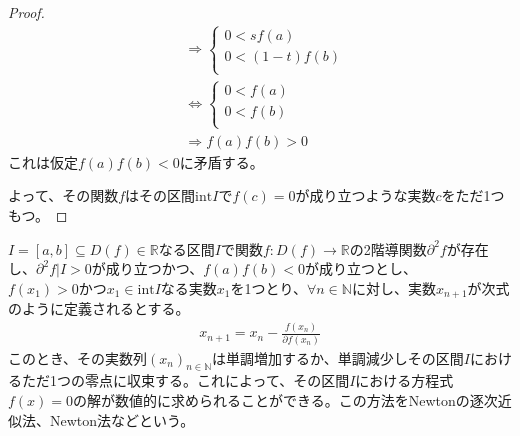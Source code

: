 \documentclass[dvipdfmx]{jsarticle}
\begin{document}
\begin{proof}
\begin{align*}
&\Rightarrow \left\{ \begin{matrix}
0 < sf(a) \\
0 < \left( 1 - t \right)f(b) \\
\end{matrix} \right.\\
&\Leftrightarrow \left\{ \begin{matrix}
0 < f(a) \\
0 < f(b) \\
\end{matrix} \right.\\
&\Rightarrow f(a)f(b) > 0
\end{align*}
これは仮定$f(a)f(b) < 0$に矛盾する。\par
よって、その関数$f$はその区間$\mathrm{int}I$で$f(c) = 0$が成り立つような実数$c$をただ1つもつ。
\end{proof}
\begin{thm}[Newtonの逐次近似法]\label{4.2.2.19}
$I = [ a,b] \subseteq D(f) \in \mathbb{R}$なる区間$I$で関数$f:D(f) \rightarrow \mathbb{R}$の2階導関数$\partial^{2}f$が存在し、$\partial^{2}f|I > 0$が成り立つかつ、$f(a)f(b) < 0$が成り立つとし、$f\left( x_{1} \right) > 0かつx_{1} \in \mathrm{int}I$なる実数$x_{1}$を1つとり、$\forall n \in \mathbb{N}$に対し、実数$x_{n + 1}$が次式のように定義されるとする。
\begin{align*}
x_{n + 1} = x_{n} - \frac{f\left( x_{n} \right)}{\partial f\left( x_{n} \right)}
\end{align*}
このとき、その実数列$\left( x_{n} \right)_{n \in \mathbb{N}}$は単調増加するか、単調減少しその区間$I$におけるただ1つの零点に収束する。これによって、その区間$I$における方程式$f(x) = 0$の解が数値的に求められることができる。この方法をNewtonの逐次近似法、Newton法などという。
\begin{center}
\end{center}
\end{thm}
\end{document}

